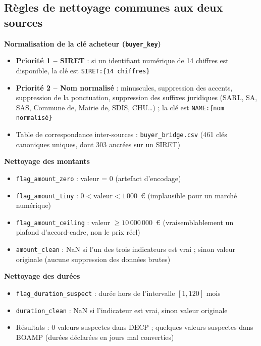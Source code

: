 \documentclass[12pt,a4paper]{article}
\begin{document}
\subsection{Règles de nettoyage communes aux deux sources}

\textbf{Normalisation de la clé acheteur (\texttt{buyer\_key})}

\begin{itemize}
  \item[---] \textbf{Priorité 1 -- SIRET} : si un identifiant numérique de
    14 chiffres est disponible, la clé est \texttt{SIRET:\{14 chiffres\}}
  \item[---] \textbf{Priorité 2 -- Nom normalisé} : minuscules, suppression
    des accents, suppression de la ponctuation, suppression des suffixes
    juridiques (SARL, SA, SAS, Commune de, Mairie de, SDIS, CHU\ldots) ;
    la clé est \texttt{NAME:\{nom normalisé\}}
  \item[---] Table de correspondance inter-sources : \texttt{buyer\_bridge.csv}
    (461 clés canoniques uniques, dont 303 ancrées sur un SIRET)
\end{itemize}

\medskip
\textbf{Nettoyage des montants}

\begin{itemize}
  \item[---] \texttt{flag\_amount\_zero} : valeur = 0 (artefact d'encodage)
  \item[---] \texttt{flag\_amount\_tiny} : $0 < \text{valeur} < 1\,000$~€
    (implausible pour un marché numérique)
  \item[---] \texttt{flag\_amount\_ceiling} : valeur $\geq 10\,000\,000$~€
    (vraisemblablement un plafond d'accord-cadre, non le prix réel)
  \item[---] \texttt{amount\_clean} : NaN si l'un des trois indicateurs est
    vrai ; sinon valeur originale (aucune suppression des données brutes)
\end{itemize}

\medskip
\textbf{Nettoyage des durées}

\begin{itemize}
  \item[---] \texttt{flag\_duration\_suspect} : durée hors de l'intervalle
    $[1, 120]$ mois
  \item[---] \texttt{duration\_clean} : NaN si l'indicateur est vrai, sinon
    valeur originale
  \item[---] Résultats : 0 valeurs suspectes dans DECP ; quelques valeurs
    suspectes dans BOAMP (durées déclarées en jours mal converties)
\end{itemize}
\end{document}
